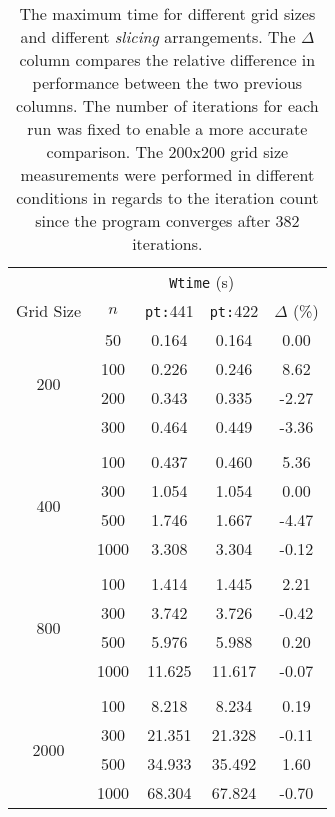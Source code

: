 \begin{table}[H]
\centering
\begin{tabular}{*{5}{c}}
 \toprule
          &     & \multicolumn{2}{c}{\texttt{Wtime} (\si{s})} & \\
Grid Size & $n$ & \texttt{pt:}441 & \texttt{pt:}422           & $\Delta$ (\%)\\ \midrule
\multirow{4}{*}{200}
    &    50   &     0.164 &     0.164 &     0.00 \\
    &    100  &     0.226 &     0.246 &     8.62 \\
    &    200  &     0.343 &     0.335 &    -2.27 \\
    &    300  &     0.464 &     0.449 &    -3.36 \\\\
\multirow{4}{*}{400}                                        
    &    100  &     0.437 &     0.460 &     5.36 \\
    &    300  &     1.054 &     1.054 &     0.00 \\
    &    500  &     1.746 &     1.667 &    -4.47 \\
    &    1000 &     3.308 &     3.304 &    -0.12 \\\\
\multirow{4}{*}{800}
    &    100  &     1.414 &     1.445 &     2.21 \\
    &    300  &     3.742 &     3.726 &    -0.42 \\
    &    500  &     5.976 &     5.988 &     0.20 \\
    &    1000 &    11.625 &    11.617 &    -0.07 \\\\
\multirow{4}{*}{2000}
    &    100  &     8.218 &     8.234 &     0.19 \\
    &    300  &    21.351 &    21.328 &    -0.11 \\
    &    500  &    34.933 &    35.492 &     1.60 \\
    &    1000 &    68.304 &    67.824 &    -0.70 \\
\bottomrule
\end{tabular}
\caption{The maximum time for different grid sizes and different \emph{slicing} arrangements. The $\Delta$ column compares the relative difference in performance between the two previous columns. The number of iterations for each run was fixed to enable a more accurate comparison. The 200x200 grid size measurements were performed in different conditions in regards to the iteration count since the program converges after 382 iterations.}
\label{tbl:slices}
\end{table}

